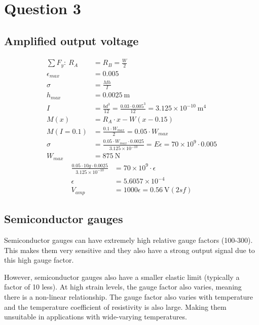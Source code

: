 \documentclass[12pt]{article}
\numberwithin{equation}{section}
\begin{document}
\section{Question 3}
\subsection*{Amplified output voltage}
\begin{align}
  \sum F_y: \ R_A &= R_B = \frac{W}{2}\\
  \epsilon_{max} &= 0.005\\
  \sigma &= \frac{Mh}{I}\\
  h_{max} &= 0.0025 \ \si{\metre}\\
  I &= \frac{bd^3}{12} = \frac{0.03 \cdot 0.005^3}{12} = 3.125 \times 10^{-10} \ \si{\metre\tothe{4}}\\
  M(x) &= R_A \cdot x - W(x-0.15)\\
  M(I=0.1) &= \frac{0.1 \cdot W_{max}}{2} = 0.05\cdot W_{max}\\
  \sigma &= \frac{0.05\cdot W_{max} \cdot 0.0025}{3.125 \times 10^{-10}} = E\epsilon = 70 \times 10^{9} \cdot 0.005\\
  W_{max} &= 875 \ \si{\newton}
\end{align}
\begin{align}
  \frac{0.05\cdot 10g \cdot 0.0025}{3.125\times 10^{-10}} &= 70 \times 10^{9} \cdot \epsilon\\
  \epsilon &= 5.6057 \times 10^{-4}\\
  V_{amp} &= 1000\epsilon = 0.56 \ \si{\volt} (2sf)
\end{align}
\subsection*{Semiconductor gauges}
Semiconductor gauges can have extremely high relative gauge factors (100-300). This makes them very sensitive and they also have a strong output signal due to this high gauge factor.

However, semiconductor gauges also have a smaller elastic limit (typically a factor of 10 less). At high strain levels, the gauge factor also varies, meaning there is a non-linear relationship. The gauge factor also varies with temperature and the temperature coefficient of resistivity is also large. Making them unsuitable in applications with wide-varying temperatures.
\end{document}
